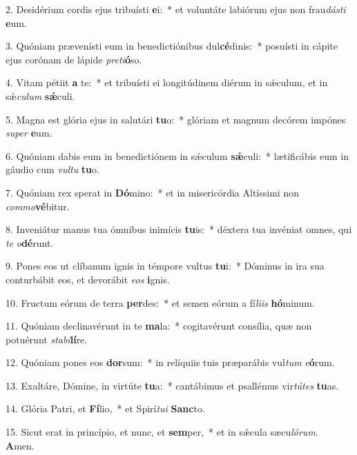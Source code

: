 2. Desidérium cordis ejus tribuísti \textbf{e}i:~*  et voluntáte labiórum ejus non frau\textit{dás}\textit{ti} \textbf{e}um.\

3. Quóniam prævenísti eum in benedictiónibus dul\textbf{cé}dinis:~*  posuísti in cápite ejus corónam de lápide \textit{pre}\textit{ti}\textbf{ó}so.\

4. Vitam pétiit \textbf{a} te:~*  et tribuísti ei longitúdinem diérum in sǽculum, et in sǽ\textit{cu}\textit{lum} \textbf{sǽ}culi.\

5. Magna est glória ejus in salutári \textbf{tu}o:~*  glóriam et magnum decórem impónes \textit{su}\textit{per} \textbf{e}um.\

6. Quóniam dabis eum in benedictiónem in sǽculum \textbf{sǽ}culi:~*  lætificábis eum in gáudio cum \textit{vul}\textit{tu} \textbf{tu}o.\

7. Quóniam rex sperat in \textbf{Dó}mino:~*  et in misericórdia Altíssimi non \textit{com}\textit{mo}\textbf{vé}bitur.\

8. Inveniátur manus tua ómnibus inimícis \textbf{tu}is:~*  déxtera tua invéniat omnes, qui \textit{te} \textit{o}\textbf{dé}runt.\

9. Pones eos ut clíbanum ignis in témpore vultus \textbf{tu}i:~*  Dóminus in ira sua conturbábit eos, et devorábit \textit{e}\textit{os} \textbf{i}gnis.\

10. Fructum eórum de terra \textbf{per}des:~*  et semen eórum a fí\textit{li}\textit{is} \textbf{hó}minum.\

11. Quóniam declinavérunt in te \textbf{ma}la:~*  cogitavérunt consília, quæ non potuérunt \textit{sta}\textit{bi}\textbf{lí}re.\

12. Quóniam pones eos \textbf{dor}sum:~*  in relíquiis tuis præparábis vul\textit{tum} \textit{e}\textbf{ó}rum.\

13. Exaltáre, Dómine, in virtúte \textbf{tu}a:~*  cantábimus et psallémus vir\textit{tú}\textit{tes} \textbf{tu}as.\

14. Glória Patri, et \textbf{Fí}lio,~*  et Spirí\textit{tu}\textit{i} \textbf{Sanc}to.\

15. Sicut erat in princípio, et nunc, et \textbf{sem}per,~*  et in sǽcula sæcu\textit{ló}\textit{rum}. \textbf{A}men.\

